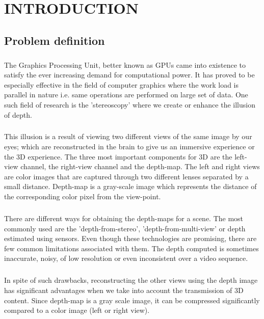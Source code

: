 \chapter{INTRODUCTION}

\section{Problem definition}

\paragraph {}
The Graphics Processing Unit, better known as GPUs came into existence to satisfy the ever increasing demand for computational power. It has proved to be especially effective in the field of computer graphics where the work load is parallel in nature i.e. same operations are performed on large set of data. One such field of research is the 'stereoscopy' where we create or enhance the illusion of depth.

\paragraph {}
This illusion is a result of viewing two different views of the same image by our eyes; which are reconstructed in the brain to give us an immersive experience or the 3D experience. The three most important components for 3D are the left-view channel, the right-view channel and the depth-map. The left and right views are color images that are captured through two different lenses separated by a small distance. Depth-map is a gray-scale image which represents the distance of the corresponding color pixel from the view-point.

\paragraph {}
There are different ways for obtaining the depth-maps for a scene. The most commonly used are the 'depth-from-stereo', 'depth-from-multi-view' or depth estimated using sensors. Even though these technologies are promising, there are few common limitations associated with them. The depth computed is sometimes inaccurate, noisy, of low resolution or even inconsistent over a video sequence. 

\paragraph {}
In spite of such drawbacks, reconstructing the other views using the depth image has significant advantages when we take into account the transmission of 3D content. Since depth-map is a gray scale image, it can be compressed significantly compared to a color image (left or right view). 

